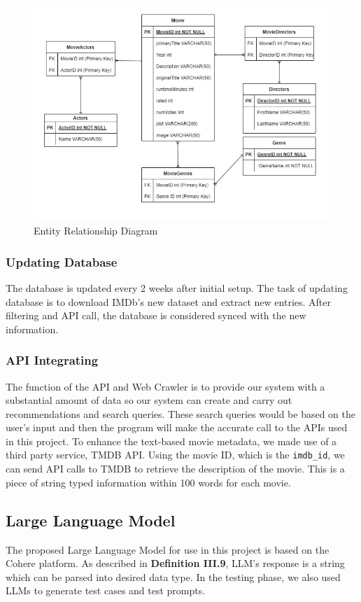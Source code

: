 \documentclass[journal]{IEEEtran}
\theoremstyle{mydefstyle}
\begin{document}
\begin{figure}
    \centering
    \includegraphics[width=1\linewidth]{doc//report//assets/erd.png}
    \caption{Entity Relationship Diagram}
    \label{fig:erd}
\end{figure}

\subsubsection{Updating Database}
The database is updated every 2 weeks after initial setup. The task of updating database is to download IMDb's new dataset and extract new entries. After filtering and API call, the database is considered synced with the new information.

\subsubsection{API Integrating}
The function of the API and Web Crawler is to provide our system with a substantial amount of data so our system can create and carry out recommendations and search queries. These search queries would be based on the user’s input and then the program will make the accurate call to the APIs used in this project. To enhance the text-based movie metadata, we made use of a third party service, TMDB API. Using the movie ID, which is the \texttt{imdb\_id}, we can send API calls to TMDB to retrieve the description of the movie. This is a piece of string typed information within 100 words for each movie. 

\subsection{Large Language Model}
The proposed Large Language Model for use in this project is based on the Cohere platform. As described in \textbf{Definition III.9}, LLM's response is a string which can be parsed into desired data type. In the testing phase, we also used LLMs to generate test cases and test prompts.
\end{document}
